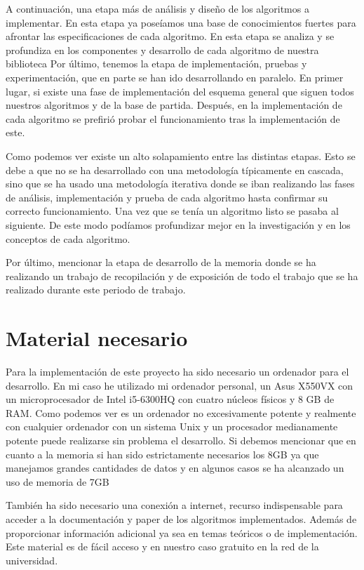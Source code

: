 A continuación, una etapa más de análisis y diseño de los algoritmos a implementar.
En esta etapa ya poseíamos una base de conocimientos fuertes para afrontar las especificaciones
de cada algoritmo. En esta etapa se analiza y se profundiza en los componentes
y desarrollo de cada algoritmo de nuestra biblioteca
Por último, tenemos la etapa de implementación, pruebas y experimentación, que 
en parte se han ido desarrollando en paralelo. En primer lugar, si existe una fase
de implementación del esquema general que siguen todos nuestros algoritmos y de la
base de partida. Después, en la implementación de cada algoritmo se prefirió probar
el funcionamiento tras la implementación de este. 

Como podemos ver existe un alto solapamiento entre las distintas etapas. Esto
se debe a que no se ha desarrollado con una metodología típicamente en cascada,
sino que se ha usado una metodología iterativa donde se iban realizando las 
fases de análisis, implementación y prueba de cada algoritmo hasta confirmar
su correcto funcionamiento. Una vez que se tenía un algoritmo listo se pasaba al
siguiente. De este modo podíamos profundizar mejor en la investigación y en los 
conceptos de cada algoritmo.

Por último, mencionar la etapa de desarrollo de la memoria donde se ha realizando
un trabajo de recopilación y de exposición de todo el trabajo que se ha realizado
durante este periodo de trabajo.


\section{Material necesario}
Para la implementación de este proyecto ha sido necesario un ordenador para el desarrollo.
En mi caso he utilizado mi ordenador personal, un Asus X550VX con un microprocesador de
Intel i5-6300HQ con cuatro núcleos físicos y 8 GB de RAM. Como podemos ver es un ordenador
no excesivamente potente y realmente con cualquier ordenador con un sistema Unix y un procesador
medianamente potente puede realizarse sin problema el desarrollo. Si debemos mencionar
que en cuanto a la memoria si han sido estrictamente necesarios los 8GB 
ya que manejamos grandes cantidades de datos y en algunos casos se ha alcanzado un uso de 
memoria de 7GB

También ha sido necesario una conexión a internet, recurso indispensable para acceder a la
documentación y paper de los algoritmos implementados. Además de proporcionar información
adicional ya sea en temas teóricos o de implementación. Este material es de fácil acceso y
en nuestro caso gratuito en la red de la universidad.



